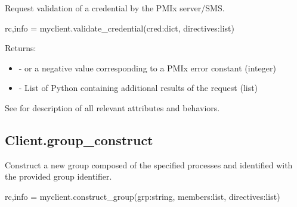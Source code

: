 \summary

Request validation of a credential by the PMIx server/SMS.

\format

\pyspecificstart
\begin{codepar}
rc,info = myclient.validate_credential(cred:dict, directives:list)
\end{codepar}
\pyspecificend

\begin{arglist}
\end{arglist}

Returns:

\begin{itemize}
    \item {} -  or a negative value corresponding to a PMIx error constant (integer)
    \item {} - List of Python  containing additional results of the request (list)
\end{itemize}

See  for description of all relevant attributes and behaviors.


\subsection{Client.group_construct}

\summary

Construct a new group composed of the specified processes and identified with
the provided group identifier.

\format

\pyspecificstart
\begin{codepar}
rc,info = myclient.construct_group(grp:string,
                        members:list, directives:list)
\end{codepar}
\pyspecificend

\begin{arglist}
\end{arglist}

